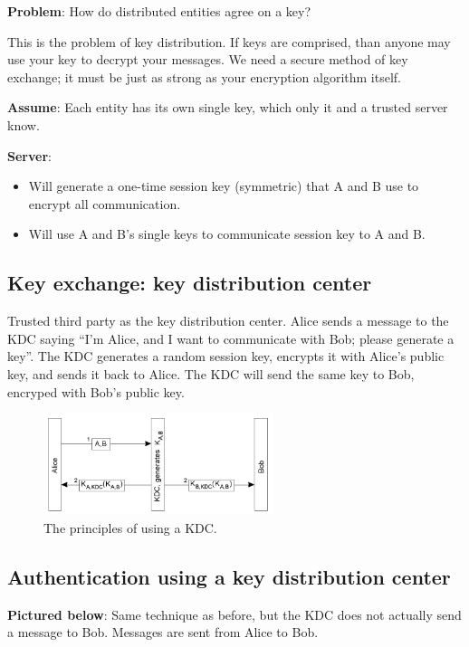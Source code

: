 \documentclass[twoside]{article}
\begin{document}
\textbf{Problem}: How do distributed entities agree on a key?

This is the problem of key distribution. If keys are comprised, than anyone may use your key to decrypt your messages. We need a secure method of key exchange; it must be just as strong as your encryption algorithm itself.

\textbf{Assume}: Each entity has its own single key, which only it and a trusted server know.

\textbf{Server}:

\begin{itemize}
\item Will generate a one-time session key (symmetric) that A and B use to encrypt all communication.
\item Will use A and B's single keys to communicate session key to A and B.
\end{itemize}

\subsection{Key exchange: key distribution center}

Trusted third party as the key distribution center. Alice sends a message to the KDC saying ``I'm Alice, and I want to communicate with Bob; please generate a key''. The KDC generates a random session key, encrypts it with Alice's public key, and sends it back to Alice. The KDC will send the same key to Bob, encryped with Bob's public key.

\begin{figure}[H]
\centering
\includegraphics[width=0.6\textwidth]{kdc.png}
\caption{The principles of using a KDC.}
\end{figure}

\subsection{Authentication using a key distribution center}

\textbf{Pictured below}: Same technique as before, but the KDC does not actually send a message to Bob. Messages are sent from Alice to Bob.
\end{document}

